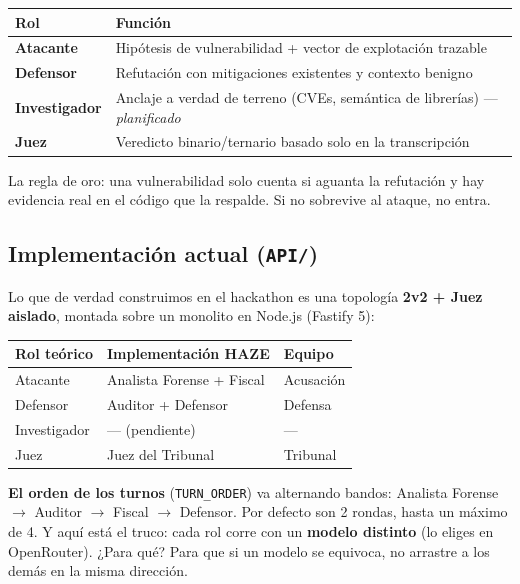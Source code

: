 \documentclass[10pt]{article}
\begin{document}
\begin{table}[h]
\centering
\small
\begin{tabularx}{\textwidth}{@{}L{3cm} X@{}}
\toprule
Rol & Función \\
\midrule
\textbf{Atacante} & Hipótesis de vulnerabilidad + vector de explotación trazable \\
\textbf{Defensor} & Refutación con mitigaciones existentes y contexto benigno \\
\textbf{Investigador} & Anclaje a verdad de terreno (CVEs, semántica de librerías) ---
\textit{planificado} \\
\textbf{Juez} & Veredicto binario/ternario basado solo en la transcripción \\
\bottomrule
\end{tabularx}
\end{table}

La regla de oro: una vulnerabilidad solo cuenta si aguanta la refutación y hay evidencia
real en el código que la respalde. Si no sobrevive al ataque, no entra.

\subsection{Implementación actual (\texttt{API/})}

Lo que de verdad construimos en el hackathon es una topología \textbf{2v2 + Juez
aislado}, montada sobre un monolito en Node.js (Fastify 5):

\begin{table}[h]
\centering
\small
\begin{tabularx}{\textwidth}{@{}L{3cm} X L{3cm}@{}}
\toprule
Rol teórico & Implementación HAZE & Equipo \\
\midrule
Atacante & Analista Forense + Fiscal & Acusación \\
Defensor & Auditor + Defensor & Defensa \\
Investigador & --- (pendiente) & --- \\
Juez & Juez del Tribunal & Tribunal \\
\bottomrule
\end{tabularx}
\end{table}

\textbf{El orden de los turnos} (\texttt{TURN\_ORDER}) va alternando bandos: Analista
Forense $\rightarrow$ Auditor $\rightarrow$ Fiscal $\rightarrow$ Defensor. Por defecto
son 2 rondas, hasta un máximo de 4. Y aquí está el truco: cada rol corre con un
\textbf{modelo distinto} (lo eliges en OpenRouter). ¿Para qué? Para que si un modelo se
equivoca, no arrastre a los demás en la misma dirección.
\end{document}
